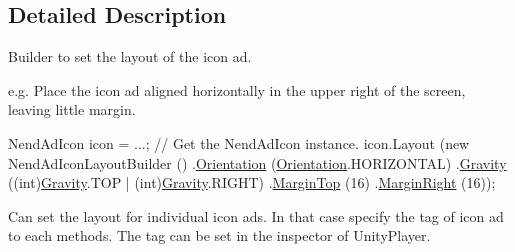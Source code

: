 \subsection{Detailed Description}
Builder to set the layout of the icon ad. 

e.\+g. Place the icon ad aligned horizontally in the upper right of the screen, leaving little margin. 
\begin{DoxyCode}
NendAdIcon icon = ...; \textcolor{comment}{// Get the NendAdIcon instance.}
icon.Layout (\textcolor{keyword}{new} NendAdIconLayoutBuilder ()
                .\hyperlink{class_nend_unity_plugin_1_1_layout_1_1_nend_ad_icon_layout_builder_a135d4506318158ed562cebc17e28d301}{Orientation} (\hyperlink{class_nend_unity_plugin_1_1_layout_1_1_nend_ad_icon_layout_builder_a135d4506318158ed562cebc17e28d301}{Orientation}.HORIZONTAL)
                .\hyperlink{class_nend_unity_plugin_1_1_layout_1_1_nend_ad_icon_layout_builder_ad1c80ced5a59145158f73dce767069ff}{Gravity} ((\textcolor{keywordtype}{int})\hyperlink{class_nend_unity_plugin_1_1_layout_1_1_nend_ad_icon_layout_builder_ad1c80ced5a59145158f73dce767069ff}{Gravity}.TOP | (\textcolor{keywordtype}{int})\hyperlink{class_nend_unity_plugin_1_1_layout_1_1_nend_ad_icon_layout_builder_ad1c80ced5a59145158f73dce767069ff}{Gravity}.RIGHT)
                .\hyperlink{class_nend_unity_plugin_1_1_layout_1_1_nend_ad_icon_layout_builder_aefcf89ef7fe5a5d4d87aa789a4ece845}{MarginTop} (16)
                .\hyperlink{class_nend_unity_plugin_1_1_layout_1_1_nend_ad_icon_layout_builder_afc17b074adf0768a75b02e976ac04656}{MarginRight} (16));
\end{DoxyCode}
 

Can set the layout for individual icon ads. In that case specify the tag of icon ad to each methods. The tag can be set in the inspector of Unity\+Player. 

